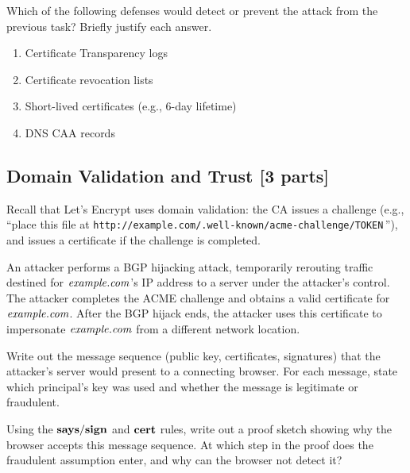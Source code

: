 \documentclass[11pt]{article}
\begin{document}
\begin{task}\rm
  Which of the following defenses would detect or prevent the attack
  from the previous task?  Briefly justify each answer.
  \begin{enumerate}
  \item Certificate Transparency logs
  \item Certificate revocation lists
  \item Short-lived certificates (e.g., 6-day lifetime)
  \item DNS CAA records
  \end{enumerate}
\end{task}

\subsection{Domain Validation and Trust [3 parts]}

Recall that Let's Encrypt uses domain validation: the CA issues a
challenge (e.g., ``place this file at
\verb'http://example.com/.well-known/acme-challenge/TOKEN'\,''),
and issues a certificate if the challenge is completed.

An attacker performs a BGP hijacking attack, temporarily rerouting
traffic destined for $\mathit{example.com}$'s IP address to a server
under the attacker's control.  The attacker completes the ACME
challenge and obtains a valid certificate for $\mathit{example.com}$.
After the BGP hijack ends, the attacker uses this certificate to
impersonate $\mathit{example.com}$ from a different network location.

\begin{task}\rm
  Write out the message sequence (public key, certificates, signatures)
  that the attacker's server would present to a connecting browser.
  For each message, state which principal's key was used and whether
  the message is legitimate or fraudulent.
\end{task}

\begin{task}\rm
  Using the $\mathbf{says}/\mathbf{sign}$ and $\mathbf{cert}$ rules, write out a
  proof sketch showing why the browser accepts this message sequence.
  At which step in the proof does the fraudulent assumption enter, and
  why can the browser not detect it?
\end{task}
\end{document}
